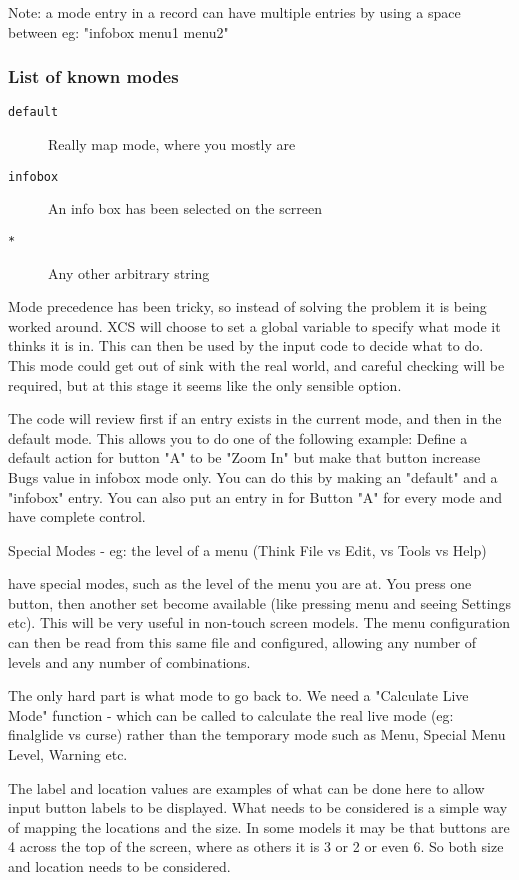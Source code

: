 Note: a mode entry in a record can have multiple entries by using a space
between eg: "infobox menu1 menu2"

\subsubsection{List of known modes}

\begin{description}
\item[\texttt{default}] Really map mode, where you mostly are
\item[\texttt{infobox}] An info box has been selected on the scrreen
\item[\texttt{*}] Any other arbitrary string
\end{description}

Mode precedence has been tricky, so instead of solving the problem
it is being worked around. XCS will choose to set a global variable
to specify what mode it thinks it is in. This can then be used by the
input code to decide what to do. This mode could get out of sink
with the real world, and careful checking will be required, but at
this stage it seems like the only sensible option.

The code will review first if an entry exists in the current mode, and
then in the default mode. This allows you to do one of the following
example: Define a default action for button "A" to be "Zoom In" but
make that button increase Bugs value in infobox mode only. You can do
this by making an "default" and a "infobox" entry. You can also put an entry
in for Button "A" for every mode and have complete control.

Special Modes - eg: the level of a menu (Think File vs Edit, vs Tools vs Help)

have special modes, such as
the level of the menu you are at. You press one button, then another
set become available (like pressing menu and seeing Settings etc). This
will be very useful in non-touch screen models. The menu configuration
can then be read from this same file and configured, allowing any
number of levels and any number of combinations.

The only hard part is what mode to go back to. We need a
"Calculate Live Mode" function - which can be called to calculate the
real live mode (eg: finalglide vs curse) rather than the temporary
mode such as Menu, Special Menu Level, Warning etc.

The label and location values are examples of what can be done here
to allow input button labels to be displayed. What needs to be
considered is a simple way of mapping the locations and the size.
In some models it may be that buttons are 4 across the top of the
screen, where as others it is 3 or 2 or even 6. So both size and
location needs to be considered.

